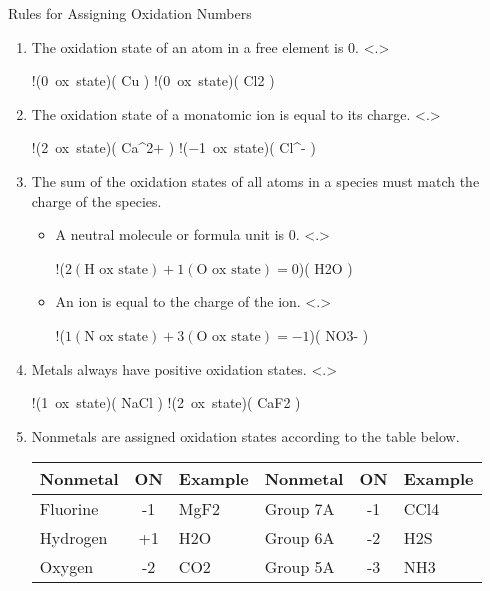 \documentclass[11pt,letterpaper]{article}
\begin{document}
\begin{frame}{Rules for Assigning Oxidation Numbers}
	\begin{enumerate}[<+->]
		\item The oxidation state of an atom in a free element
			is 0.
			\only<.>{
				\begin{reaction*}
					!(0~ox~state)( Cu ) 
					\qquad\qquad 
					!(0~ox~state)( Cl2 )
				\end{reaction*}
				}
		\item The oxidation state of a monatomic ion is equal to
			its charge.
			\only<.>{
				\begin{reaction*}
					!(\num{+2}~ox~state)( Ca^{2+} )
					\qquad\qquad
					!(\num{-1}~ox~state)( Cl^{-} )
				\end{reaction*}
				}
		\item The sum of the oxidation states of all atoms in a
			species must match the charge of the species.
			\begin{itemize}
				\item A neutral molecule or formula unit
					is 0.
					\only<.>{
						\begin{reaction*}
							!({$2 (\text{H~ox~state})
							+ 1 (\text{O~ox~state})
							= 0$})( H2O )
						\end{reaction*}
						}
				\item An ion is equal to the charge of
					the ion.
					\only<.>{
						\begin{reaction*}
							!({$1 (\text{N~ox~state})
							+ 3 (\text{O~ox~state})
							= -1$})( NO3- )
						\end{reaction*}
						}
			\end{itemize}
		\item Metals always have positive oxidation states.
			\only<.>{
				\begin{reaction*}
					!(\num{+1}~ox~state)( \alert{Na}Cl )
					\qquad\qquad
					!(\num{+2}~ox~state)( \alert{Ca}F2 )
				\end{reaction*}
				}
		\item Nonmetals are assigned oxidation states according
			to the table below.
			\begin{center}
				\small
				\begin{tabular} {l S e | l S e}
					\toprule
					\textbf{Nonmetal} & \textbf{ON} & \textbf{Example} &
					\textbf{Nonmetal} & \textbf{ON} & \textbf{Example} \\
					\midrule
					Fluorine & -1 & MgF2 & Group 7A & -1 & CCl4 \\
					Hydrogen & +1 & H2O  & Group 6A & -2 & H2S \\
					Oxygen & -2 & CO2    & Group 5A & -3 & NH3 \\
					\bottomrule
				\end{tabular}
			\end{center}
	\end{enumerate}
\end{frame}
\end{document}
